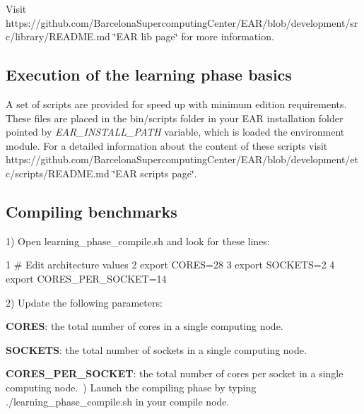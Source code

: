 Visit https\+://github.com/\+Barcelona\+Supercomputing\+Center/\+E\+A\+R/blob/development/src/library/\+R\+E\+A\+D\+M\+E.\+md \char`\"{}\+E\+A\+R lib page\char`\"{} for more information.

\subsection*{Execution of the learning phase basics }

A set of scripts are provided for speed up with minimum edition requirements. These files are placed in the {\ttfamily bin/scripts} folder in your E\+AR installation folder pointed by {\itshape E\+A\+R\+\_\+\+I\+N\+S\+T\+A\+L\+L\+\_\+\+P\+A\+TH} variable, which is loaded the environment module. For a detailed information about the content of these scripts visit https\+://github.com/\+Barcelona\+Supercomputing\+Center/\+E\+A\+R/blob/development/etc/scripts/\+R\+E\+A\+D\+M\+E.\+md \char`\"{}\+E\+A\+R scripts page\char`\"{}.

\subsection*{Compiling benchmarks }

1) Open {\ttfamily learning\+\_\+phase\+\_\+compile.\+sh} and look for these lines\+: 
\begin{DoxyCode}
1 # Edit architecture values
2 export CORES=28
3 export SOCKETS=2
4 export CORES\_PER\_SOCKET=14
\end{DoxyCode}
 2) Update the following parameters\+:~\newline

\begin{DoxyItemize}
\item {\bfseries C\+O\+R\+ES}\+: the total number of cores in a single computing node.~\newline

\item {\bfseries S\+O\+C\+K\+E\+TS}\+: the total number of sockets in a single computing node.~\newline

\item {\bfseries C\+O\+R\+E\+S\+\_\+\+P\+E\+R\+\_\+\+S\+O\+C\+K\+ET}\+: the total number of cores per socket in a single computing node.~) Launch the compiling phase by typing {\ttfamily ./learning\+\_\+phase\+\_\+compile.sh} in your compile node.
\end{DoxyItemize}

